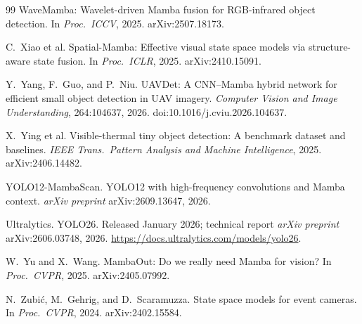 \begin{thebibliography}{99}
WaveMamba: Wavelet-driven Mamba fusion for RGB-infrared object detection.
In \textit{Proc.\ ICCV}, 2025. arXiv:2507.18173.

C.~Xiao et al.
Spatial-Mamba: Effective visual state space models via structure-aware state
fusion. In \textit{Proc.\ ICLR}, 2025. arXiv:2410.15091.

Y.~Yang, F.~Guo, and P.~Niu.
UAVDet: A CNN--Mamba hybrid network for efficient small object detection in
UAV imagery. \textit{Computer Vision and Image Understanding}, 264:104637,
2026. doi:10.1016/j.cviu.2026.104637.

X.~Ying et al.
Visible-thermal tiny object detection: A benchmark dataset and baselines.
\textit{IEEE Trans.\ Pattern Analysis and Machine Intelligence}, 2025.
arXiv:2406.14482.

YOLO12-MambaScan. YOLO12 with high-frequency convolutions and Mamba context.
\textit{arXiv preprint} arXiv:2609.13647, 2026.

Ultralytics.
YOLO26. Released January 2026; technical report \textit{arXiv preprint}
arXiv:2606.03748, 2026. \url{https://docs.ultralytics.com/models/yolo26}.

W.~Yu and X.~Wang.
MambaOut: Do we really need Mamba for vision?
In \textit{Proc.\ CVPR}, 2025. arXiv:2405.07992.

N.~Zubi\'c, M.~Gehrig, and D.~Scaramuzza.
State space models for event cameras.
In \textit{Proc.\ CVPR}, 2024. arXiv:2402.15584.

\end{thebibliography}
